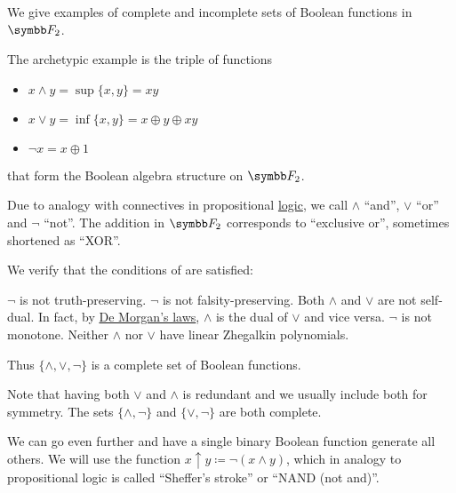 \begin{example}\label{ex:thm:posts_completeness_theorem}
  We give examples of complete and incomplete sets of Boolean functions in \( \BF_2 \).

  \begin{ExEnum}
     The archetypic example is the triple of functions
    \begin{itemize}
      \item \( x \wedge y = \sup \{ x, y \} = xy \)
      \item \( x \vee y = \inf \{ x, y \} = x \oplus y \oplus xy \)
      \item \( \neg x = x \oplus 1 \)
    \end{itemize}
    that form the Boolean algebra structure on \( \BF_2 \).

    Due to analogy with connectives in propositional \hyperref[def:propositional_alphabet]{logic}, we call \( \wedge \) \enquote{and}, \( \vee \) \enquote{or} and \( \neg \) \enquote{not}. The addition in \( \BF_2 \) corresponds to \enquote{exclusive or}, sometimes shortened as \enquote{XOR}.

    We verify that the conditions of  are satisfied:

    \begin{RefList}
       \( \neg \) is not truth-preserving.
       \( \neg \) is not falsity-preserving.
       Both \( \wedge \) and \( \vee \) are not self-dual. In fact, by \hyperref[thm:de_morgans_laws]{De Morgan's laws}, \( \wedge \) is the dual of \( \vee \) and vice versa.
       \( \neg \) is not monotone.
       Neither \( \wedge \) nor \( \vee \) have linear Zhegalkin polynomials.
    \end{RefList}

    Thus \( \{ \wedge, \vee, \neg \} \) is a complete set of Boolean functions.

    Note that having both \( \vee \) and \( \wedge \) is redundant and we usually include both for symmetry. The sets \( \{ \wedge, \neg \} \) and \( \{ \vee, \neg \} \) are both complete.

     We can go even further and have a single binary Boolean function generate all others. We will use the function \( x \uparrow y \coloneqq \neg(x \wedge y) \), which in analogy to propositional logic is called \enquote{Sheffer's stroke} or \enquote{NAND (not and)}.


\end{ExEnum}
\end{example}
